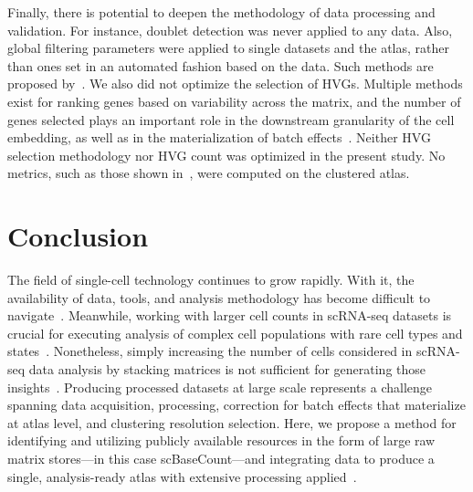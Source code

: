 \documentclass[10pt,letterpaper]{article}
\begin{document}
Finally, there is potential to deepen the methodology of data processing and validation. For instance, doublet detection was never applied to any data. Also, global filtering parameters were applied to single datasets and the atlas, rather than ones set in an automated fashion based on the data. Such methods are proposed by~\textcite{oliverSinglecellIntegrationReveals2024}. We also did not optimize the selection of HVGs. Multiple methods exist for ranking genes based on variability across the matrix, and the number of genes selected plays an important role in the downstream granularity of the cell embedding, as well as in the materialization of batch effects~\parencite{kiselevChallengesUnsupervisedClustering2019,zhaoSystematicEvaluationHighly2025,liInformedBatchCorrection2026}. Neither HVG selection methodology nor HVG count was optimized in the present study. No metrics, such as those shown in~, were computed on the clustered atlas.


\section*{Conclusion}

The field of single-cell technology continues to grow rapidly. With it, the availability of data, tools, and analysis methodology has become difficult to navigate~\parencite{heumosBestPracticesSinglecell2023}. Meanwhile, working with larger cell counts in scRNA-seq datasets is crucial for executing analysis of complex cell populations with rare cell types and states~\parencite{kolodziejczykTechnologyBiologySingleCell2015}. Nonetheless, simply increasing the number of cells considered in scRNA-seq data analysis by stacking matrices is not sufficient for generating those insights~\parencite{muellerBuildingOptimizedSinglecell2026}. Producing processed datasets at large scale represents a challenge spanning data acquisition, processing, correction for batch effects that materialize at atlas level, and clustering resolution selection. Here, we propose a method for identifying and utilizing publicly available resources in the form of large raw matrix stores---in this case scBaseCount---and integrating data to produce a single, analysis-ready atlas with extensive processing applied~\parencite{youngblutScBaseCountAIAgentcurated2025}.
\end{document}
